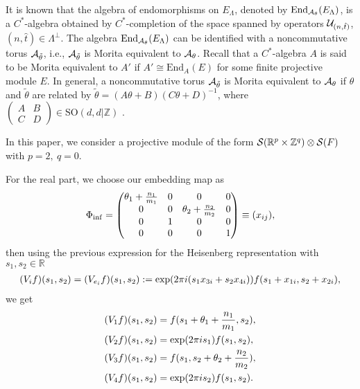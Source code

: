 \documentclass[12pt, a4paper]{article}
\newcommand{\Z}{{\mathbb Z}}
\newcommand{\R}{{\mathbb R}}
\newcommand{\C}{{\mathbb C}}
\begin{document}
It is known that the algebra of endomorphisms on ${E}_\Lambda$,
denoted by $\text{End}_{{\cal A}_\theta}({E}_\Lambda)$, is a
$C^*$-algebra obtained by $C^*$-completion of the space spanned by
operators ${\cal U}_{(n,\hat t)}$, $(n,\hat t)\in\Lambda^\perp$.
The algebra $\text{End}_{{\cal A}_\theta}({E}_\Lambda)$ can be
identified with a noncommutative torus ${\cal
A}_{\tilde{\theta}}$, i.e., ${\cal A}_{\tilde{\theta}}$ is Morita
equivalent to ${\cal A}_\theta$\cite{rief88}.
Recall that a $C^*$-algebra $A$ is said to be Morita equivalent to
$A'$ if $A' \cong \text{End}_A(E)$ for some finite projective
module $E$. In general, a noncommutative torus ${\cal
A}_{\tilde{\theta}}$ is Morita equivalent to ${\cal A}_\theta$ if
$\theta$ and $\tilde{\theta}$ are related by
$\tilde{\theta}=(A\theta+B)(C\theta+D)^{-1}$, where $\left(
\begin{array}{cc} A&B\\C&D\end{array} \right) \in \text{
SO}(d,d|{\Z})$  \cite{rs98}.

In this paper, we consider a projective module of the form ${\cal
S}({\R}^p\times{\Z}^q)\otimes {\cal S}(F)$ with $p=2, \ q=0$.

For the real part, we choose our
embedding map as
\begin{align}\label{phii}
\Phi_{\rm inf}=\begin{pmatrix}\theta_1 + \frac{n_1}{m_1}&0 &0&0\\
                0&0&\theta_2 + \frac{n_2}{m_2}&0\\
                0&1&0&0\\
                0&0&0&1\end{pmatrix} \equiv (x_{ij}),
\end{align}
then using the previous expression for the Heisenberg
representation with $s_1,s_2 \in \R$
\begin{align}
(V_if)(s_1,s_2)=(V_{e_i}f)(s_1,s_2):=\exp(2\pi
i(s_1x_{3i}+s_2x_{4i}))f(s_1+x_{1i},s_2+x_{2i}), \notag
\end{align}
we get
\begin{align}
(V_1f)(s_1,s_2)&=f(s_1 + \theta_1 + \frac{n_1}{m_1}, s_2), \nonumber\\
(V_2f)(s_1,s_2)&=\exp( 2\pi i s_1 )f(s_1, s_2), \nonumber\\
(V_3f)(s_1,s_2)&=f(s_1,s_2 + \theta_2 + \frac{n_2}{m_2} ), \notag\\
(V_4f)(s_1,s_2)&=\exp(2 \pi i s_2)f(s_1,s_2).\nonumber
\end{align}
\end{document}
